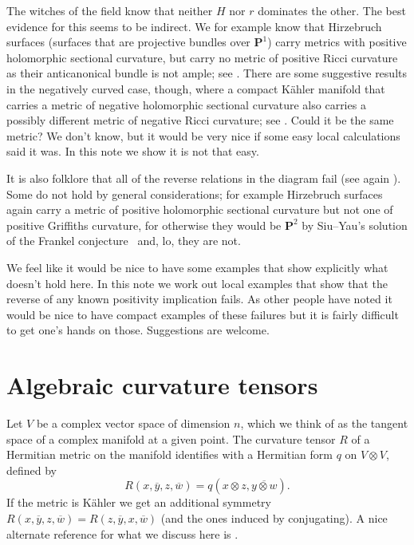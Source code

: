 \documentclass[10pt,a4paper]{amsart}
\theoremstyle{definition}
\def\ov#1{\overline{#1}}
\newcommand{\kk}[1]{\mathbf{#1}}
\begin{document}
The witches of the field know that neither $H$ nor $r$ dominates the other.
The best evidence for this seems to be indirect.
We for example know that Hirzebruch surfaces (surfaces that are projective
bundles over $\kk P^1$) carry metrics with positive holomorphic sectional
curvature, but carry no metric of positive Ricci curvature as their anticanonical
bundle is not ample;
see \cite{hitchin1975curvature,alvarez2018projectivized,yang2019hirzebruch}.
There are some suggestive results in the negatively curved case, though,
where a compact K\"ahler manifold that carries a metric of negative holomorphic
sectional curvature also carries a possibly different metric of negative Ricci
curvature; see \cite{wu2016negative,tosatti2017extension,diverio2019quasi}.
Could it be the same metric?
We don't know, but it would be very nice if some easy local calculations said
it was. In this note we show it is not that easy.

It is also folklore that all of the reverse relations in the diagram fail (see
again \cite{zheng2000complex}). Some do not hold by general considerations; for
example Hirzebruch surfaces
again carry a metric of positive holomorphic sectional curvature but not one of
positive Griffiths curvature, for otherwise they would be $\kk P^2$ by
Siu--Yau's solution of the Frankel conjecture~\cite{siu1980compact} and, lo,
they are not.

We feel like it would be nice to have some examples that show explicitly what
doesn't hold here.
In this note we work out local examples that show that the reverse of any known
positivity implication fails.
As other people have noted it would be nice to have compact examples of these
failures but it is fairly difficult to get one's hands on those.
Suggestions are welcome.



\section{Algebraic curvature tensors}



Let $V$ be a complex vector space of dimension $n$, which we think of as the
tangent space of a complex manifold at a given point.
The curvature tensor $R$ of a Hermitian metric on the manifold identifies with
a Hermitian form $q$ on $V \otimes V$, defined by
$$
R(x, \ov y, z, \ov w)
= q(x \otimes z, \ov{y \otimes w}).
$$
If the metric is K\"ahler we get an additional symmetry
$R(x, \ov y, z, \ov w) = R(z, \ov y, x, \ov w)$
(and the ones induced by conjugating).
A nice alternate reference for what we discuss here is
\cite{algebraic-kahler-curvature}.
\end{document}
